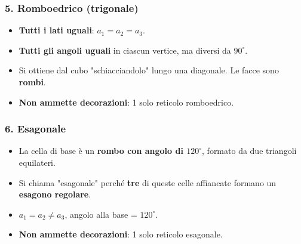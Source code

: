 \subsubsection{5. Romboedrico (trigonale)}
\begin{itemize}
    \item \textbf{Tutti i lati uguali}: $a_1 = a_2 = a_3$.
    \item \textbf{Tutti gli angoli uguali} in ciascun vertice, ma diversi da $90^\circ$.
    \item Si ottiene dal cubo "schiacciandolo" lungo una diagonale. Le facce sono \textbf{rombi}.
    \item \textbf{Non ammette decorazioni}: 1 solo reticolo romboedrico.
\end{itemize}

\subsubsection{6. Esagonale}
\begin{itemize}
    \item La cella di base è un \textbf{rombo con angolo di $120^\circ$}, formato da due triangoli equilateri.
    \item Si chiama "esagonale" perché \textbf{tre} di queste celle affiancate formano un \textbf{esagono regolare}.
    \item $a_1 = a_2 \neq a_3$, angolo alla base = $120^\circ$.
    \item \textbf{Non ammette decorazioni}: 1 solo reticolo esagonale.
\end{itemize}

